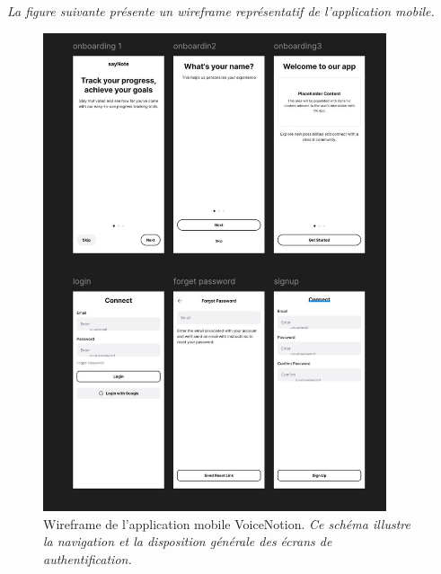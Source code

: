         \textit{La figure suivante présente un wireframe représentatif de l'application mobile.}
    \begin{figure}[htbp]
        \centering
        \includegraphics[width=0.9\textwidth]{assets/docs/mobile/wireframe_app-1.jpg}
        \caption{Wireframe de l'application mobile VoiceNotion. \newline\textit{Ce schéma illustre la navigation et la disposition générale des écrans de authentification.}}
        \label{fig:wireframe_app_auth}
    \end{figure}
    
